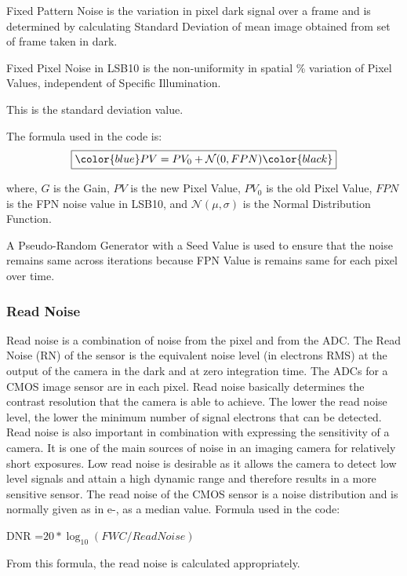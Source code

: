Fixed Pattern Noise is the variation in pixel dark signal over a frame and is determined by calculating Standard Deviation of mean image obtained from set of frame taken in dark.

Fixed Pixel Noise in LSB10 is the non-uniformity in spatial \% variation of
Pixel Values, independent of Specific Illumination.

This is the standard deviation value.

The formula used in the code is:
\begin{equation}
    \boxed{ \color{blue} PV = PV_0 + \mathcal{N}(0, FPN)   \color{black}}
\end{equation}

where, $G$ is the Gain, $PV$ is the new Pixel Value, $PV_0$ is the old Pixel Value, $FPN$ is the FPN noise value in LSB10, and $\mathcal{N}(\mu, \sigma)$ is the Normal Distribution Function.

A Pseudo-Random Generator with a Seed Value is used to ensure that the noise remains same across iterations because FPN Value is remains same for each pixel over time.


\subsubsection{Read Noise} %
Read noise is a combination of noise from the pixel and from the ADC. The Read Noise (RN) of the sensor is the equivalent noise level (in electrons RMS) at the output of the camera in the dark and at zero integration time. The ADCs for a CMOS image sensor are in each pixel.
Read noise basically determines the contrast resolution that the camera is able to achieve. The lower the read noise level, the lower the minimum number of signal electrons that can be detected. Read noise is also important in combination with expressing the sensitivity of a camera. 
It is one of the main sources of noise in an imaging camera for relatively short exposures. Low read noise is desirable as it allows the camera to detect low level signals and attain a high dynamic range and therefore results in a more sensitive sensor.
The read noise of the CMOS sensor is a noise distribution and is normally given as in e-, as a median value.
Formula used in the code:

DNR =$ 20 * \log_{10}{(FWC / Read Noise)}$

From this formula, the read noise is calculated appropriately.

